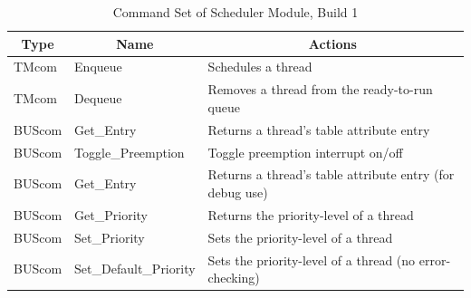 \begin{table}
\caption{\label{tab:commands1}Command Set of Scheduler Module, Build 1}
\centering
\begin{tabular}{llp{3.0in}}
\hline
\multicolumn{1}{c}{\textbf{Type}} &
\multicolumn{1}{c}{\textbf{Name}} &
\multicolumn{1}{c}{\textbf{Actions}} \\
\hline
TMcom	&	Enqueue				& Schedules a thread\\
TMcom	&	Dequeue				& Removes a thread from the ready-to-run queue	\\
BUScom	&	Get\_Entry     		& Returns a thread's table attribute entry		\\
BUScom	&	Toggle\_Preemption	& Toggle preemption interrupt on/off	\\
BUScom	&	Get\_Entry     		& Returns a thread's table attribute entry (for debug use)		\\
BUScom	&	Get\_Priority		& Returns the priority-level of a thread	\\
BUScom	&	Set\_Priority		& Sets the priority-level of a thread\\
BUScom	&	Set\_Default\_Priority		& Sets the priority-level of a thread (no error-checking)\\
\hline
\end{tabular}
\end{table}

